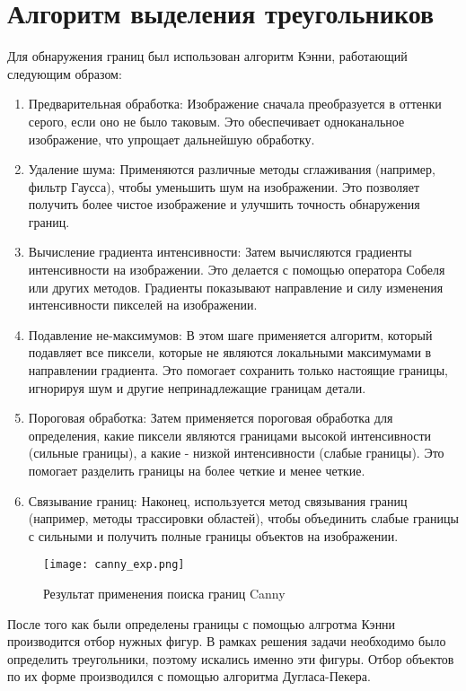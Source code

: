 \documentclass{article}
\begin{document}
\section{Алгоритм выделения треугольников}
Для обнаружения границ был использован алгоритм Кэнни, работающий следующим образом:
\begin{enumerate}
    \item Предварительная обработка: Изображение сначала преобразуется в оттенки серого, если оно не было таковым. Это обеспечивает одноканальное изображение, что упрощает дальнейшую обработку.
    \item Удаление шума: Применяются различные методы сглаживания (например, фильтр Гаусса), чтобы уменьшить шум на изображении. Это позволяет получить более чистое изображение и улучшить точность обнаружения границ.
    \item Вычисление градиента интенсивности: Затем вычисляются градиенты интенсивности на изображении. Это делается с помощью оператора Собеля или других методов. Градиенты показывают направление и силу изменения интенсивности пикселей на изображении.
    \item Подавление не-максимумов: В этом шаге применяется алгоритм, который подавляет все пиксели, которые не являются локальными максимумами в направлении градиента. Это помогает сохранить только настоящие границы, игнорируя шум и другие непринадлежащие границам детали.
    \item Пороговая обработка: Затем применяется пороговая обработка для определения, какие пиксели являются границами высокой интенсивности (сильные границы), а какие - низкой интенсивности (слабые границы). Это помогает разделить границы на более четкие и менее четкие.
    \item Связывание границ: Наконец, используется метод связывания границ (например, методы трассировки областей), чтобы объединить слабые границы с сильными и получить полные границы объектов на изображении.
\end{enumerate}

\begin{figure}[h!]
    \centering
    \texttt{[image: canny\_exp.png]}
    \caption{Результат применения поиска границ Canny}
    \label{fig:enter-label}
\end{figure}

После того как были определены границы с помощью алгротма Кэнни производится отбор нужных фигур. В рамках решения задачи необходимо было определить треугольники, поэтому искались именно эти фигуры. Отбор объектов по их форме производился с помощью алгоритма Дугласа-Пекера. 
\end{document}
